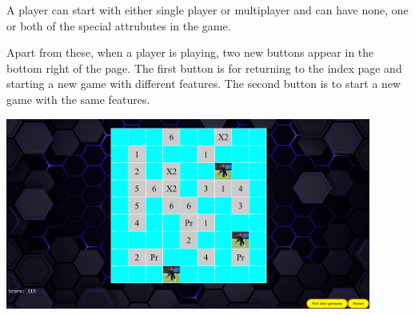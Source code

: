 \documentclass{article}
\begin{document}
A player can start with either single player or multiplayer and can have none, one or both of the special attrubutes in the game.

Apart from these, when a player is playing, two new buttons appear in the bottom right of the page. The first button is for returning to the index page and starting a new game with different features. The second button is to start a new game with the same features.

\includegraphics[width = 0.9\textwidth]{image4.png}

\newpage

\nocite{*}


\end{document}
